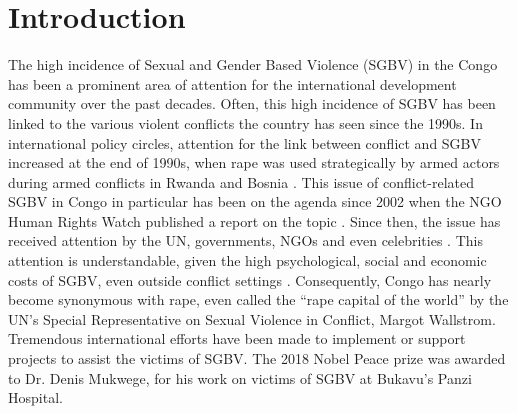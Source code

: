 \documentclass[10pt,a4paper,abstract=on]{scrartcl} %
\begin{document}
\linenumbers




\section*{Introduction}
The high incidence of Sexual and Gender Based Violence (SGBV) in the Congo has been a prominent area of attention for the international development community over the past decades. Often, this high incidence of SGBV has been linked to the various violent conflicts the country has seen since the 1990s. In international policy circles, attention for the link between conflict and SGBV increased at the end of 1990s, when rape was used strategically by armed actors during armed conflicts in Rwanda and Bosnia  \citep{Kirby2015}. This issue of conflict-related SGBV in Congo in particular has been on the agenda since 2002 when the NGO Human Rights Watch published a report on the topic \citep{HRW2002}. Since then, the issue has received attention by the UN, governments, NGOs and even celebrities \citep{Baaz2013}. This attention is understandable, given the high psychological, social and economic costs of SGBV, even outside conflict settings \citep{Post2002,Peterson2018}. Consequently, Congo has nearly become synonymous with rape, even called the ``rape capital of the world'' by the UN's Special Representative on Sexual Violence in Conflict, Margot Wallstrom. Tremendous international efforts have been made to implement or support projects to assist the victims of SGBV. The 2018 Nobel Peace prize was awarded to Dr. Denis Mukwege, for his work on victims of SGBV at Bukavu's Panzi Hospital.
 
\end{document}
